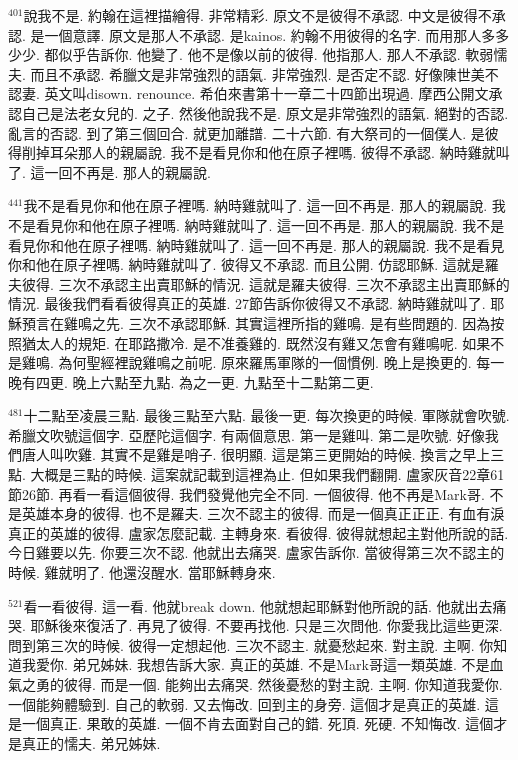 \documentclass{book}
\begin{document}
$^{401}$說我不是.
約翰在這裡描繪得.
非常精彩.
原文不是彼得不承認.
中文是彼得不承認.
是一個意譯.
原文是那人不承認.
是kainos.
約翰不用彼得的名字.
而用那人多多少少.
都似乎告訴你.
他變了.
他不是像以前的彼得.
他指那人.
那人不承認.
軟弱懦夫.
而且不承認.
希臘文是非常強烈的語氣.
非常強烈.
是否定不認.
好像陳世美不認妻.
英文叫disown.
renounce.
希伯來書第十一章二十四節出現過.
摩西公開文承認自己是法老女兒的.
之子.
然後他說我不是.
原文是非常強烈的語氣.
絕對的否認.
亂言的否認.
到了第三個回合.
就更加離譜.
二十六節.
有大祭司的一個僕人.
是彼得削掉耳朵那人的親屬說.
我不是看見你和他在原子裡嗎.
彼得不承認.
納時雞就叫了.
這一回不再是.
那人的親屬說.

$^{441}$我不是看見你和他在原子裡嗎.
納時雞就叫了.
這一回不再是.
那人的親屬說.
我不是看見你和他在原子裡嗎.
納時雞就叫了.
這一回不再是.
那人的親屬說.
我不是看見你和他在原子裡嗎.
納時雞就叫了.
這一回不再是.
那人的親屬說.
我不是看見你和他在原子裡嗎.
納時雞就叫了.
彼得又不承認.
而且公開.
仿認耶穌.
這就是羅夫彼得.
三次不承認主出賣耶穌的情況.
這就是羅夫彼得.
三次不承認主出賣耶穌的情況.
最後我們看看彼得真正的英雄.
27節告訴你彼得又不承認.
納時雞就叫了.
耶穌預言在雞鳴之先.
三次不承認耶穌.
其實這裡所指的雞鳴.
是有些問題的.
因為按照猶太人的規矩.
在耶路撒冷.
是不准養雞的.
既然沒有雞又怎會有雞鳴呢.
如果不是雞鳴.
為何聖經裡說雞鳴之前呢.
原來羅馬軍隊的一個慣例.
晚上是換更的.
每一晚有四更.
晚上六點至九點.
為之一更.
九點至十二點第二更.

$^{481}$十二點至凌晨三點.
最後三點至六點.
最後一更.
每次換更的時候.
軍隊就會吹號.
希臘文吹號這個字.
亞歷陀這個字.
有兩個意思.
第一是雞叫.
第二是吹號.
好像我們唐人叫吹雞.
其實不是雞是哨子.
很明顯.
這是第三更開始的時候.
換言之早上三點.
大概是三點的時候.
這案就記載到這裡為止.
但如果我們翻開.
盧家灰音22章61節26節.
再看一看這個彼得.
我們發覺他完全不同.
一個彼得.
他不再是Mark哥.
不是英雄本身的彼得.
也不是羅夫.
三次不認主的彼得.
而是一個真正正正.
有血有淚真正的英雄的彼得.
盧家怎麼記載.
主轉身來.
看彼得.
彼得就想起主對他所說的話.
今日雞要以先.
你要三次不認.
他就出去痛哭.
盧家告訴你.
當彼得第三次不認主的時候.
雞就明了.
他還沒醒水.
當耶穌轉身來.

$^{521}$看一看彼得.
這一看.
他就break down.
他就想起耶穌對他所說的話.
他就出去痛哭.
耶穌後來復活了.
再見了彼得.
不要再找他.
只是三次問他.
你愛我比這些更深.
問到第三次的時候.
彼得一定想起他.
三次不認主.
就憂愁起來.
對主說.
主啊.
你知道我愛你.
弟兄姊妹.
我想告訴大家.
真正的英雄.
不是Mark哥這一類英雄.
不是血氣之勇的彼得.
而是一個.
能夠出去痛哭.
然後憂愁的對主說.
主啊.
你知道我愛你.
一個能夠體驗到.
自己的軟弱.
又去悔改.
回到主的身旁.
這個才是真正的英雄.
這是一個真正.
果敢的英雄.
一個不肯去面對自己的錯.
死頂.
死硬.
不知悔改.
這個才是真正的懦夫.
弟兄姊妹.
\end{document}
